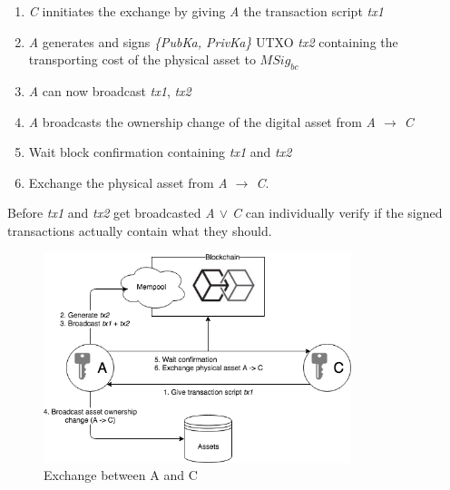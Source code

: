 \begin{enumerate}
  \item \textit{C} innitiates the exchange by giving \textit{A} the transaction script \textit{tx1}
  \item \textit{A} generates and signs \textit{\{PubKa, PrivKa\}} UTXO \textit{tx2} containing the transporting cost of the physical asset to \(MSig_{bc}\)
  \item \textit{A} can now broadcast \textit{tx1}, \textit{tx2}
  \item \textit{A} broadcasts the ownership change of the digital asset from \textit{A $\rightarrow$ C}
  \item Wait block confirmation containing \textit{tx1} and \textit{tx2}
  \item Exchange the physical asset from \textit{A $\rightarrow$ C}.
\end{enumerate}

Before \textit{tx1} and \textit{tx2} get broadcasted \textit{A $\lor$ C} can individually verify if the signed transactions actually contain what they should.

\begin{figure}[h]
\centering
\includegraphics[width=0.8\textwidth]{images/exchange_01.png}
\caption{Exchange between A and C}
\label{fig:2 first exchange}
\end{figure}

